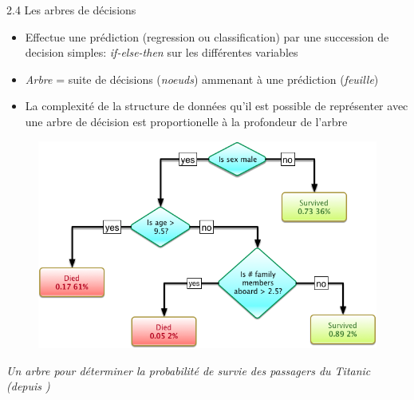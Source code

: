 \begin{frame}{2.4 Les arbres de décisions}
  \begin{itemize}
  \item Effectue une prédiction (regression ou classification) par une succession de decision simples: \textit{if-else-then} sur les différentes variables
  \item \textit{Arbre} = suite de décisions (\textit{noeuds}) ammenant à une prédiction (\textit{feuille})
  \end{itemize}
  \begin{minipage}{.45\textwidth}
    \begin{itemize}
    \item La complexité de la structure de données qu'il est possible de représenter avec une arbre de décision est proportionelle à la profondeur de l'arbre
    \end{itemize}
  \end{minipage}
  \begin{minipage}{.54\textwidth}
    \begin{figure}
      \includegraphics[width=.9\textwidth]{figs/decisionTreeExample.png}
    \end{figure}
    \begin{center}
      \scriptsize
      \textit{Un arbre pour déterminer la probabilité de survie des passagers du Titanic (depuis \href{https://en.wikipedia.org/wiki/Decision_tree_learning}{\color{blue}{Wikipedia}})}
    \end{center}
  \end{minipage}
\end{frame}

